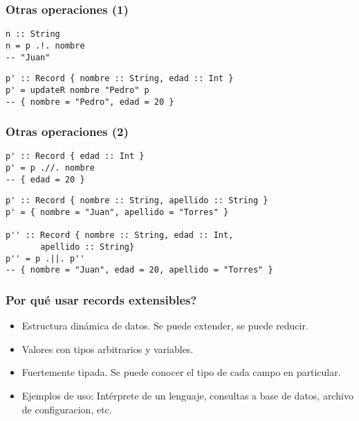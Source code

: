 \documentclass{beamer}
\begin{document}
\begin{frame}[fragile]
\frametitle{Otras operaciones (1)}

\begin{example}[Lookup]
\begin{verbatim}
n :: String
n = p .!. nombre
-- "Juan"
\end{verbatim}
\end{example}

\pause

\vspace{12pt}

\begin{example}[Update]
\begin{verbatim}
p' :: Record { nombre :: String, edad :: Int }
p' = updateR nombre "Pedro" p
-- { nombre = "Pedro", edad = 20 }
\end{verbatim}
\end{example}

\end{frame}

\begin{frame}[fragile]
\frametitle{Otras operaciones (2)}

\begin{example}[Delete]
\begin{verbatim}
p' :: Record { edad :: Int }
p' = p .//. nombre
-- { edad = 20 }
\end{verbatim}
\end{example}

\pause

\begin{example}[Union]
\begin{verbatim}
p' :: Record { nombre :: String, apellido :: String }
p' = { nombre = "Juan", apellido = "Torres" }

p'' :: Record { nombre :: String, edad :: Int,
       apellido :: String}
p'' = p .||. p''
-- { nombre = "Juan", edad = 20, apellido = "Torres" }
\end{verbatim}
\end{example}

\end{frame}

\begin{frame}
\frametitle{Por qué usar records extensibles?}

\begin{itemize}
\item Estructura dinámica de datos. Se puede extender, se puede reducir.
\item Valores con tipos arbitrarios y variables.
\item Fuertemente tipada. Se puede conocer el tipo de cada campo en particular.
\item Ejemplos de uso: Intérprete de un lenguaje, consultas a base de datos, archivo de configuracion, etc.
\end{itemize}

\end{frame}
\end{document}
